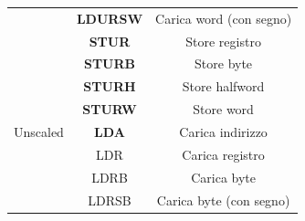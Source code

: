 \documentclass[12pt,a4paper]{article}
\begin{document}
\begin{center}
\begin{tabular}{|c|c|c|}
                                                                                                             & \textbf{LDURSW} & Carica word (con segno)                                                                                   \\ \cline{2-3} 
                                                                                                             & \textbf{STUR}   & Store registro                                                                                            \\ \cline{2-3} 
                                                                                                             & \textbf{STURB}  & Store byte                                                                                                \\ \cline{2-3} 
                                                                                                             & \textbf{STURH}  & Store halfword                                                                                            \\ \cline{2-3} 
                                                                                                             & \textbf{STURW}  & Store word                                                                                                \\ \cline{2-3} 
\multirow{-11}{*}{Unscaled}                                                                                  & \textbf{LDA}    & Carica indirizzo                                                                                          \\ \hline
                                                                                                             & LDR             & Carica registro                                                                                           \\ \cline{2-3} 
                                                                                                             & LDRB            & Carica byte                                                                                               \\ \cline{2-3} 
                                                                                                             & LDRSB           & Carica byte (con segno)                                                                                   \\ \cline{2-3} 

\end{tabular}
\end{center}
\end{document}

